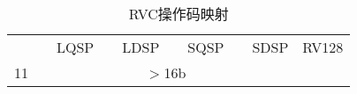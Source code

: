 \begin{table*}[htbp]
\begin{center}
{\begin{tabular}{|r|c|c|c|c|c|c|c|c|l}
                        &                           & LQSP  &                       & LDSP                          &                                & SQSP               &                       & SDSP                  & RV128 \\ \cline{1-9}
    \cellcolor{gray} 11  & \multicolumn{8}{c|}{\cellcolor{gray} $>$16b} \\ \cline{1-9}
 \end{tabular}
}
\end{center}
\vspace{-0.15in}
\caption{RVC操作码映射}
\label{rvcopcodemap}
\end{table*}
